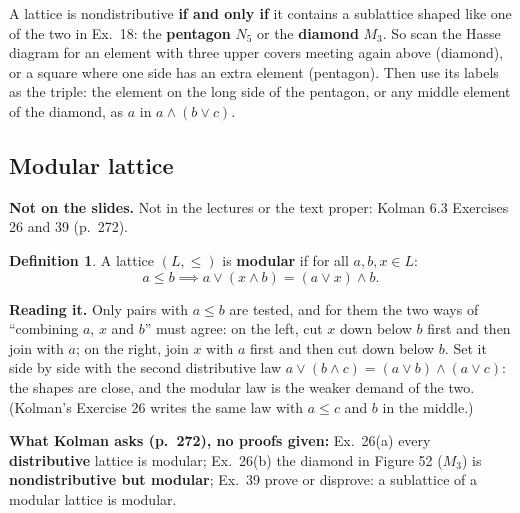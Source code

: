 \documentclass{fkt-notes}
\newcommand{\notslides}[1]{\par\noindent\textbf{Not on the slides.} #1\par}
\theoremstyle{definition}
\newtheorem*{defn}{Definition}
\begin{document}
\begin{rulebox}[title={Not on the slides: where to find the counterexample (Kolman 6.3 Theorem 6)}]
  A lattice is nondistributive \textbf{if and only if} it contains a
  sublattice shaped like one of the two in Ex.~18: the \textbf{pentagon}
  $N_5$ or the \textbf{diamond} $M_3$. So scan the Hasse diagram for an
  element with three upper covers meeting again above (diamond), or a
  square where one side has an extra element (pentagon). Then use its
  labels as the triple: the element on the long side of the pentagon, or
  any middle element of the diamond, as $a$ in $a\wedge(b\vee c)$.
\end{rulebox}

\subsection{Modular lattice}
%
\notslides{Not in the lectures or the text proper: Kolman 6.3
  Exercises 26 and 39 (p.~272).}
\begin{defn}
  A lattice $(L,\le)$ is \textbf{modular} if for all $a,b,x\in L$:
  \[
    a\le b \implies a\vee(x\wedge b)=(a\vee x)\wedge b.
  \]
\end{defn}
\textbf{Reading it.} Only pairs with $a\le b$ are tested, and for them
the two ways of ``combining $a$, $x$ and $b$'' must agree: on the left,
cut $x$ down below $b$ first and then join with $a$; on the right, join
$x$ with $a$ first and then cut down below $b$. Set it side by side with
the second distributive law $a\vee(b\wedge c)=(a\vee b)\wedge(a\vee c)$:
the shapes are close, and the modular law is the weaker demand of the
two. (Kolman's Exercise 26 writes the same law with $a\le c$ and $b$ in
the middle.)

\begin{rulepar}
  \textbf{What Kolman asks (p.~272), no proofs given:}
  Ex.~26(a) every \textbf{distributive} lattice is modular;
  Ex.~26(b) the diamond in Figure 52 ($M_3$) is \textbf{nondistributive
    but modular};
  Ex.~39 prove or disprove: a sublattice of a modular lattice is modular.
\end{rulepar}
\end{document}
